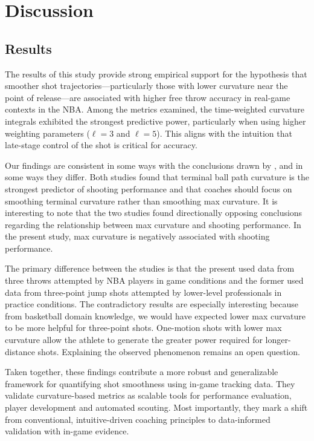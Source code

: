 \documentclass{article}
\begin{document}
\section{Discussion}

    \subsection{Results}
      
      The results of this study provide strong empirical support for the hypothesis that smoother shot trajectories---particularly those with lower curvature near the point of release---are associated with higher free throw accuracy in real-game contexts in the NBA. Among the metrics examined, the time-weighted curvature integrals exhibited the strongest predictive power, particularly when using higher weighting parameters (\(\ell=3\) and \(\ell=5\)). This aligns with the intuition that late-stage control of the shot is critical for accuracy.
      
      Our findings are consistent in some ways with the conclusions drawn by \citet{slegers_role_2024}, and in some ways they differ. Both studies found that terminal ball path curvature is the strongest predictor of shooting performance and that coaches should focus on smoothing terminal curvature rather than smoothing max curvature. It is interesting to note that the two studies found directionally opposing conclusions regarding the relationship between max curvature and shooting performance. In the present study, max curvature is negatively associated with shooting performance.

      The primary difference between the studies is that the present used data from three throws attempted by NBA players in game conditions and the former used data from three-point jump shots attempted by lower-level professionals in practice conditions. The contradictory results are especially interesting because from basketball domain knowledge, we would have expected lower max curvature to be more helpful for three-point shots. One-motion shots with lower max curvature allow the athlete to generate the greater power required for longer-distance shots. Explaining the observed phenomenon remains an open question. 
      
      Taken together, these findings contribute a more robust and generalizable framework for quantifying shot smoothness using in-game tracking data. They validate curvature-based metrics as scalable tools for performance evaluation, player development and automated scouting. Most importantly, they mark a shift from conventional, intuitive-driven coaching principles to data-informed validation with in-game evidence.
\end{document}
